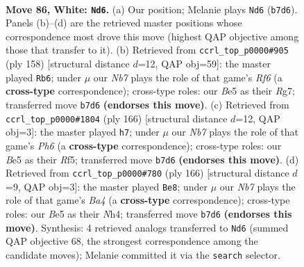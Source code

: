 \documentclass[11pt]{article}
\begin{document}
\clearpage

\begin{figure}[p]\centering
\begin{subfigure}{0.46\textwidth}\centering
\resizebox{\linewidth}{!}{%
\newchessgame
\chessboard[
  setfen={5k2/1NPK4/8/4B3/8/8/3r4/8 w - - 85 86},
  showmover=false,
  pgfstyle=straightmove, color=movearrow, markmove={b7-d6}
]}
\caption{}
\end{subfigure}\hfill
\begin{subfigure}{0.46\textwidth}\centering
\resizebox{\linewidth}{!}{%
\newchessgame
\chessboard[
  setfen={8/1KP3R1/5R2/8/8/1r6/7k/8 w - - 3 80},
  showmover=false,
  pgfstyle=straightmove, color=movearrow, markmove={f6-b6}
]}
\caption{}
\end{subfigure}
\\[4pt]
\begin{subfigure}{0.46\textwidth}\centering
\resizebox{\linewidth}{!}{%
\newchessgame
\chessboard[
  setfen={8/8/r6P/5R2/7k/5P2/5K2/8 w - - 3 84},
  showmover=false,
  pgfstyle=straightmove, color=movearrow, markmove={h6-h7}
]}
\caption{}
\end{subfigure}\hfill
\begin{subfigure}{0.46\textwidth}\centering
\resizebox{\linewidth}{!}{%
\newchessgame
\chessboard[
  setfen={8/8/r7/8/B4k1N/8/6PK/8 w - - 1 84},
  showmover=false,
  pgfstyle=straightmove, color=movearrow, markmove={a4-e8}
]}
\caption{}
\end{subfigure}
\caption{\textbf{Move 86, White: \texttt{Nd6}.} (a) Our position; Melanie plays \texttt{Nd6} (\texttt{b7d6}). Panels (b)--(d) are the retrieved master positions whose correspondence most drove this move (highest QAP objective among those that transfer to it). (b) Retrieved from \texttt{ccrl\_top\_p0000\#905} (ply 158) [structural distance $d$=12, QAP obj=59]: the master played \texttt{Rb6}; under $\mu$ our \emph{Nb7} plays the role of that game's \emph{Rf6} (a \textbf{cross-type} correspondence); cross-type roles: our \emph{B}e5 as their \emph{R}g7; transferred move \texttt{b7d6} \textbf{(endorses this move)}. (c) Retrieved from \texttt{ccrl\_top\_p0000\#1804} (ply 166) [structural distance $d$=12, QAP obj=3]: the master played \texttt{h7}; under $\mu$ our \emph{Nb7} plays the role of that game's \emph{Ph6} (a \textbf{cross-type} correspondence); cross-type roles: our \emph{B}e5 as their \emph{R}f5; transferred move \texttt{b7d6} \textbf{(endorses this move)}. (d) Retrieved from \texttt{ccrl\_top\_p0000\#780} (ply 166) [structural distance $d$=9, QAP obj=3]: the master played \texttt{Be8}; under $\mu$ our \emph{Nb7} plays the role of that game's \emph{Ba4} (a \textbf{cross-type} correspondence); cross-type roles: our \emph{B}e5 as their \emph{N}h4; transferred move \texttt{b7d6} \textbf{(endorses this move)}. Synthesis: 4 retrieved analogs transferred to \texttt{Nd6} (summed QAP objective 68, the strongest correspondence among the candidate moves); Melanie committed it via the \texttt{search} selector.}
\label{fig:thought-m170}
\end{figure}
\end{document}
